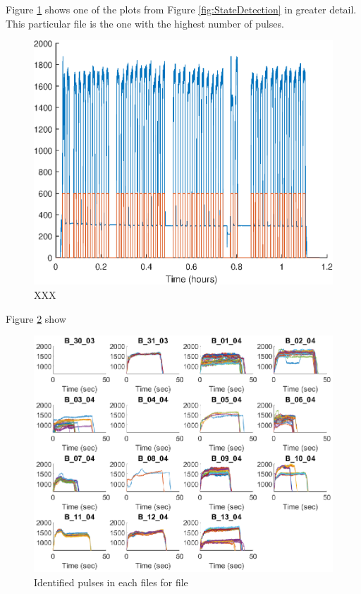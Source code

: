\documentclass{article}
\begin{document}
Figure \ref{fig:StateDetectionFig_B_02_04} shows one of the plots from Figure \ref{fig:StateDetection} in greater detail. This particular file is the one with the highest number of pulses.
\begin{figure}[H]
    \centering
    \includegraphics[width=\textwidth, height=\textheight, keepaspectratio]{figures/StateDetectionFig_B_02_04.eps}
    \caption{XXX}
    \label{fig:StateDetectionFig_B_02_04}
\end{figure}

Figure \ref{fig:IdentifiedPulses} show 
\begin{figure}[H]
    \centering
    \includegraphics[width=\textwidth, height=\textheight, keepaspectratio]{figures/IdentifiedPulsesFig.eps}
    \caption{Identified pulses in each files for file}
    \label{fig:IdentifiedPulses}
\end{figure}
\end{document}
